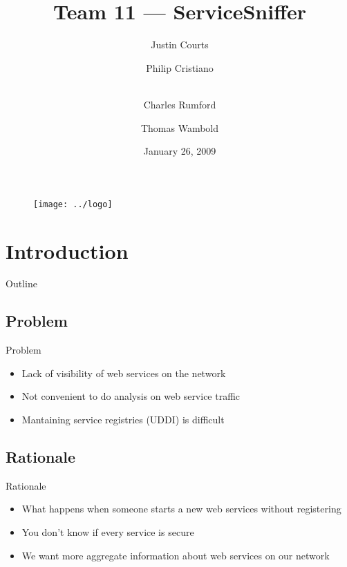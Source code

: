 \documentclass{beamer}
\title[ServiceSniffer]{Team 11 --- ServiceSniffer}
\author[Team 11]{
    Justin Courts \and
    Philip Cristiano \and\\
    Charles Rumford \and
    Thomas Wambold}
\institute[CS492]{CS492\\Drexel University\\\url{http://servicesniffer.net}}
\date{January 26, 2009}
\begin{document}
\begin{frame}
    \begin{figure}
        \centering
        \texttt{[image: ../logo]}
    \end{figure}
    \vspace{-10mm}
    \titlepage
\end{frame}


\section{Introduction}
\begin{frame}{Outline}
    \tableofcontents[hideallsubsections]
\end{frame}


\subsection{Problem}
\begin{frame}{Problem}
    \begin{itemize}
        \item Lack of visibility of web services on the network
        \item Not convenient to do analysis on web service traffic
        \item Mantaining service registries (UDDI) is difficult
    \end{itemize}
\end{frame}


\subsection{Rationale}
\begin{frame}{Rationale}
    \begin{itemize}
        \item What happens when someone starts a new web services without registering
        \item You don't know if every service is secure
        \item We want more aggregate information about web services on our network
    \end{itemize}
\end{frame}
\end{document}
